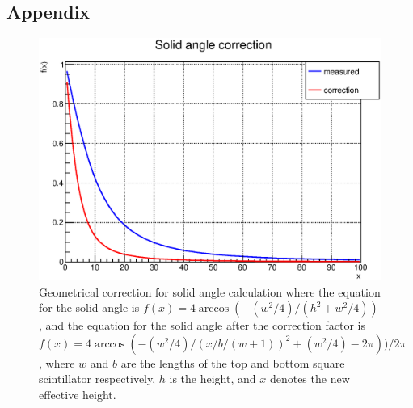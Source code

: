 \documentclass[11pt,twocolumn]{article}
\begin{document}
\subsection{Appendix}
\begin{figure}[h]
\begin{center}
\includegraphics[scale=0.5]{solid.eps}
\caption{Geometrical correction for solid angle calculation where the equation for the solid angle is $f(x) = 4\arccos(-(w^{2}/4)/(h^2+w^2/4))$, and the equation for the solid angle after the correction factor is $f(x) = 4\arccos(-(w^2/4)/(x/b/(w+1))^2 + (w^2/4) - 2\pi))/2\pi$, where $w$ and $b$ are the lengths of the top and bottom square scintillator respectively, $h$ is the height, and $x$ denotes the new effective height. }
\end{center}
\end{figure}


\end{document}
